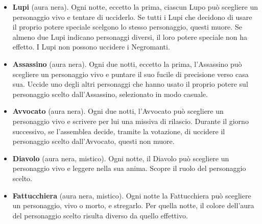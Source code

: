 \documentclass[a4paper,10pt]{article}
\begin{document}
\begin{itemize}
 \item {\bf Lupi} (aura nera). Ogni notte, eccetto la prima, ciascun Lupo può scegliere un personaggio vivo e tentare di ucciderlo. Se tutti i Lupi che decidono di usare il proprio potere speciale scelgono lo stesso personaggio, questi muore. Se almeno due Lupi indicano personaggi diversi, il loro potere speciale non ha effetto. I Lupi non possono uccidere i Negromanti.
 
 
 \item {\bf Assassino} (aura nera). Ogni due notti, eccetto la prima, l'Assassino può scegliere un personaggio vivo e puntare il suo fucile di precisione verso casa sua. Uccide uno degli altri personaggi che hanno usato il proprio potere sul personaggio scelto dall'Assassino, selezionato in modo casuale.
 

 \item {\bf Avvocato} (aura nera). Ogni due notti, l'Avvocato può scegliere un personaggio vivo e scrivere per lui una missiva di rilascio.
 Durante il giorno successivo, se l'assemblea decide, tramite la votazione, di uccidere il personaggio scelto dall'Avvocato, questi non muore.
 

 \item {\bf Diavolo} (aura nera, mistico). Ogni notte, il Diavolo può scegliere un personaggio vivo e leggere nella sua anima. Scopre il ruolo del personaggio scelto.
 
 
 \item {\bf Fattucchiera} (aura nera, mistico). Ogni notte la Fattucchiera può scegliere un personaggio, vivo o morto, e stregarlo. Per quella notte, il colore dell'aura del personaggio scelto risulta diverso da quello effettivo.
 
 
  

\end{itemize}
\end{document}
